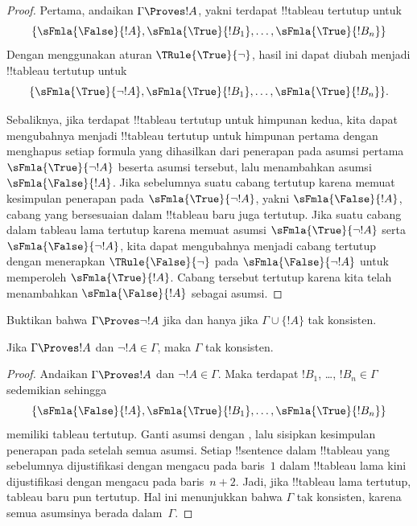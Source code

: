 \documentclass[../../../include/open-logic-section]{subfiles}
\begin{document}
\begin{proof}
Pertama, andaikan $\Gamma \Proves !A$, yakni terdapat !!{tableau}
tertutup untuk
\[
\{\sFmla{\False}{!A},
\sFmla{\True}{!B_1}, \dots, \sFmla{\True}{!B_n}\}
\]
Dengan menggunakan aturan $\TRule{\True}{\lnot}$, hasil ini dapat diubah
menjadi !!{tableau} tertutup untuk
\[
\{\sFmla{\True}{\lnot !A},
\sFmla{\True}{!B_1}, \dots, \sFmla{\True}{!B_n}\}.
\]

Sebaliknya, jika terdapat !!{tableau} tertutup untuk himpunan kedua,
kita dapat mengubahnya menjadi !!{tableau} tertutup untuk himpunan
pertama dengan menghapus setiap formula yang dihasilkan dari penerapan
\TRule{\True}{\lnot} pada asumsi pertama
$\sFmla{\True}{\lnot !A}$ beserta asumsi tersebut, lalu menambahkan
asumsi $\sFmla{\False}{!A}$. Jika sebelumnya suatu cabang tertutup karena
memuat kesimpulan penerapan \TRule{\True}{\lnot} pada
$\sFmla{\True}{\lnot !A}$, yakni $\sFmla{\False}{!A}$, cabang yang
bersesuaian dalam !!{tableau} baru juga tertutup. Jika suatu cabang dalam
tableau lama tertutup karena memuat asumsi
$\sFmla{\True}{\lnot !A}$ serta $\sFmla{\False}{\lnot !A}$, kita dapat
mengubahnya menjadi cabang tertutup dengan menerapkan
$\TRule{\False}{\lnot}$ pada $\sFmla{\False}{\lnot !A}$ untuk memperoleh
$\sFmla{\True}{!A}$. Cabang tersebut tertutup karena kita telah
menambahkan $\sFmla{\False}{!A}$ sebagai asumsi.
\end{proof}

\begin{prob}
Buktikan bahwa $\Gamma \Proves \lnot !A$ jika dan hanya jika
$\Gamma \cup \{!A\}$ tak konsisten.
\end{prob}

\begin{prop}
  Jika $\Gamma \Proves !A$ dan $\lnot !A \in \Gamma$, maka $\Gamma$
  tak konsisten.
\end{prop}

\begin{proof}
  Andaikan $\Gamma \Proves !A$ dan $\lnot !A \in \Gamma$. Maka terdapat
  $!B_1$, \dots, $!B_n \in \Gamma$ sedemikian sehingga \ 
  \[
  \{\sFmla{\False}{!A}, \sFmla{\True}{!B_1}, \dots,
  \sFmla{\True}{!B_n}\}
  \]
  memiliki tableau tertutup. Ganti asumsi  dengan
  , lalu sisipkan kesimpulan penerapan
  \TRule{\True}{\lnot} pada \sFmla{\True}{\lnot !A} setelah semua
  asumsi. Setiap !!{sentence} dalam !!{tableau} yang sebelumnya
  dijustifikasi dengan mengacu pada baris~$1$ dalam !!{tableau} lama kini
  dijustifikasi dengan mengacu pada baris~$n+2$. Jadi, jika !!{tableau}
  lama tertutup, tableau baru pun tertutup. Hal ini menunjukkan bahwa
  $\Gamma$ tak konsisten, karena semua asumsinya
  berada dalam~$\Gamma$.
\end{proof}
\end{document}
